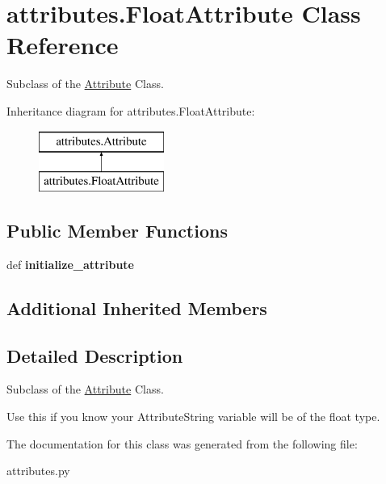 \hypertarget{classattributes_1_1_float_attribute}{\section{attributes.\-Float\-Attribute Class Reference}
\label{classattributes_1_1_float_attribute}
}


Subclass of the \hyperlink{classattributes_1_1_attribute}{Attribute} Class.  


Inheritance diagram for attributes.\-Float\-Attribute\-:\begin{figure}[H]
\begin{center}
\leavevmode
\includegraphics[height=2.000000cm]{classattributes_1_1_float_attribute}
\end{center}
\end{figure}
\subsection*{Public Member Functions}
\begin{DoxyCompactItemize}
\item 
\hypertarget{classattributes_1_1_float_attribute_ae7bff791c6736cc02774c795411f5260}{def {\bfseries initialize\-\_\-attribute}}\label{classattributes_1_1_float_attribute_ae7bff791c6736cc02774c795411f5260}

\end{DoxyCompactItemize}
\subsection*{Additional Inherited Members}


\subsection{Detailed Description}
Subclass of the \hyperlink{classattributes_1_1_attribute}{Attribute} Class. 

Use this if you know your Attribute\-String variable will be of the float type. 

The documentation for this class was generated from the following file\-:\begin{DoxyCompactItemize}
\item 
attributes.\-py\end{DoxyCompactItemize}

